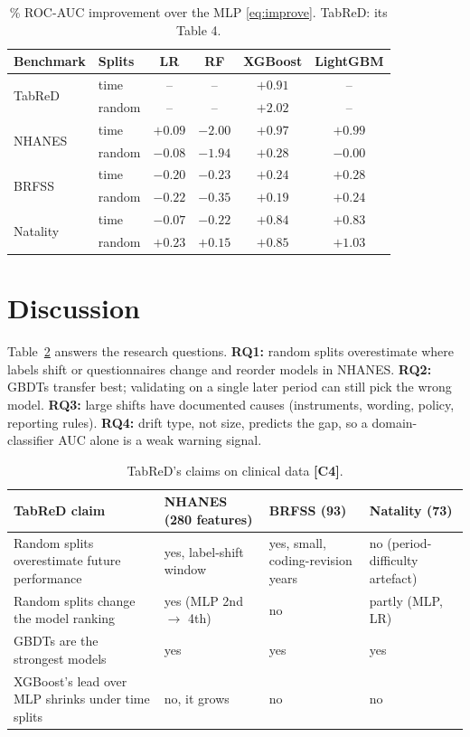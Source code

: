 \documentclass[journal,twoside,web]{ieeecolor}
\DeclareRobustCommand{\contrib}[1]{\textbf{\textcolor{contribframe}{[C#1]}}}
\begin{document}
\begin{table}[!t]
\caption{\% ROC-AUC improvement over the MLP \eqref{eq:improve}. TabReD: its Table 4.}
\label{tab:sota}
\centering
\setlength{\tabcolsep}{3.5pt}
\begin{tabular}{@{}llcccc@{}}
\toprule
Benchmark & Splits & LR & RF & XGBoost & LightGBM \\
\midrule
\multirow{2}{*}{TabReD \cite{rubachev2025tabred}} & time & -- & -- & $+0.91$ & -- \\
 & random & -- & -- & $+2.02$ & -- \\
\midrule
\multirow{2}{*}{NHANES} & time & $+0.09$ & $-2.00$ & $\mathbf{+0.97}$ & $\mathbf{+0.99}$ \\
 & random & $-0.08$ & $-1.94$ & $+0.28$ & $-0.00$ \\
\multirow{2}{*}{BRFSS} & time & $-0.20$ & $-0.23$ & $+0.24$ & $+0.28$ \\
 & random & $-0.22$ & $-0.35$ & $+0.19$ & $+0.24$ \\
\multirow{2}{*}{Natality} & time & $-0.07$ & $-0.22$ & $+0.84$ & $+0.83$ \\
 & random & $+0.23$ & $+0.15$ & $+0.85$ & $+1.03$ \\
\bottomrule
\end{tabular}
\end{table}

\section{Discussion}
\label{sec:discussion}
Table~\ref{tab:claims} answers the research questions. \textbf{RQ1:} random splits overestimate
where labels shift or questionnaires change and reorder models in NHANES. \textbf{RQ2:} GBDTs
transfer best; validating on a single later period can still pick the wrong model. \textbf{RQ3:}
large shifts have documented causes (instruments, wording, policy, reporting rules).
\textbf{RQ4:} drift type, not size, predicts the gap, so a domain-classifier AUC alone is a weak
warning signal.

\begin{table}[!t]
\caption{TabReD's claims on clinical data \contrib{4}.}
\label{tab:claims}
\centering
\begin{tabular}{@{}p{5.0cm}p{3.7cm}p{3.9cm}p{3.6cm}@{}}
\toprule
TabReD claim & NHANES (280 features) & BRFSS (93) & Natality (73) \\
\midrule
Random splits overestimate future performance & yes, label-shift window & yes, small, coding-revision years & no (period-difficulty artefact) \\
Random splits change the model ranking & yes (MLP 2nd $\rightarrow$ 4th) & no & partly (MLP, LR) \\
GBDTs are the strongest models & yes & yes & yes \\
XGBoost's lead over MLP shrinks under time splits & no, it grows & no & no \\
\bottomrule
\end{tabular}
\end{table}
\end{document}
